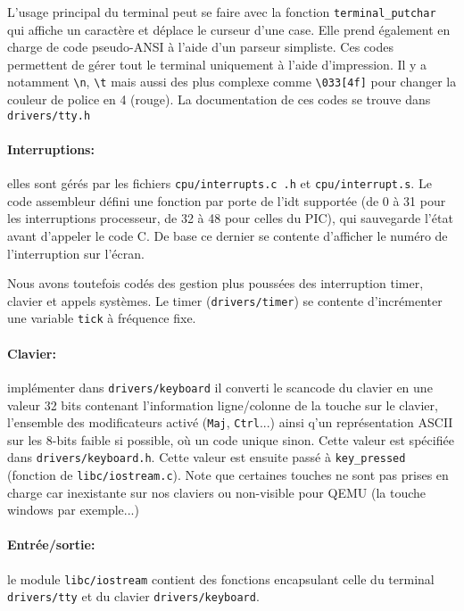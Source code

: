 \documentclass[12pt,a4paper]{article}
\begin{document}
L'usage principal du terminal peut se faire avec la fonction \texttt{terminal\_putchar} qui affiche un caractère et déplace le curseur d'une case. Elle prend également en charge de code pseudo-ANSI à l'aide d'un parseur simpliste. Ces codes permettent de gérer tout le terminal uniquement à l'aide d'impression. Il y a notamment \texttt{\textbackslash n}, \texttt{\textbackslash t} mais aussi des plus complexe comme \texttt{\textbackslash 033[4f]} pour changer la couleur de police en 4 (rouge). La documentation de ces codes se trouve dans \texttt{drivers/tty.h}

\paragraph{Interruptions:} elles sont gérés par les fichiers \texttt{cpu/interrupts.c .h} et \texttt{cpu/interrupt.s}. Le code assembleur défini une fonction par porte de l'idt supportée (de 0 à 31 pour les interruptions processeur, de 32 à 48 pour celles du PIC), qui sauvegarde l'état avant d'appeler le code C. De base ce dernier se contente d'afficher le numéro de l'interruption sur l'écran. 


Nous avons toutefois codés des gestion plus poussées des interruption timer, clavier et appels systèmes. Le timer (\texttt{drivers/timer}) se contente d'incrémenter une variable \texttt{tick} à fréquence fixe.

\paragraph{Clavier:} implémenter dans \texttt{drivers/keyboard} il converti le scancode du clavier en une valeur 32 bits contenant l'information ligne/colonne de la touche sur le clavier, l'ensemble des modificateurs activé (\texttt{Maj}, \texttt{Ctrl}...) ainsi q'un représentation ASCII sur les 8-bits faible si possible, où un code unique sinon. Cette valeur est spécifiée dans \texttt{drivers/keyboard.h}. Cette valeur est ensuite passé à \texttt{key\_pressed} (fonction de \texttt{libc/iostream.c}). Note que certaines touches ne sont pas prises en charge car inexistante sur nos claviers ou non-visible pour QEMU (la touche windows par exemple...)


\paragraph{Entrée/sortie:} le module \texttt{libc/iostream} contient des fonctions encapsulant celle du terminal \texttt{drivers/tty} et du clavier \texttt{drivers/keyboard}. 
\end{document}
